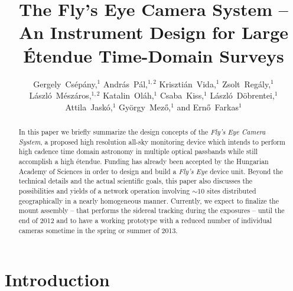 
\resetcounters




\title{The Fly's Eye Camera System -- An Instrument Design for Large \'Etendue Time-Domain Surveys}
\author{%
Gergely~Cs\'ep\'any,$^{1}$
Andr\'as~P\'al,$^{1,2}$
Kriszti\'an~Vida,$^{1}$
Zsolt~Reg\'aly,$^{1}$
L\'aszl\'o~M\'esz\'aros,$^{1,2}$
Katalin~Ol\'ah,$^{1}$
Csaba~Kiss,$^{1}$
L\'aszl\'o~D\"obrentei,$^{1}$
Attila~Jask\'o,$^{1}$
Gy\"orgy~Mez\H{o},$^{1}$ and
Ern\H{o}~Farkas$^{1}$
}


\begin{abstract}
In this paper we briefly summarize the design concepts of the {\it Fly's Eye Camera System}, a proposed high resolution all-sky monitoring device which intends to perform high cadence time domain astronomy in multiple optical passbands while still accomplish a high \'etendue. Funding has already been accepted by the Hungarian Academy of Sciences in order to design and build a {\it Fly's Eye} device unit. Beyond the technical details and the actual scientific goals, this paper also discusses the possibilities and yields of a network operation involving $\sim10$ sites distributed geographically in  a nearly homogeneous manner. Currently, we expect  to finalize the mount assembly -- that performs the sidereal tracking during the exposures -- until the end of 2012 and to have a working prototype with a reduced number of individual cameras sometime in the spring or summer of 2013.
\end{abstract}

\section{Introduction}

